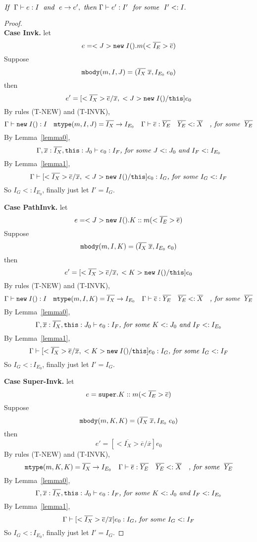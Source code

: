 \begin{theorem}
$\textit{If } \ \judgeewf \Gamma {e : I} \; \textit{ and } \ e \rightarrow e',\ 
\textit{then } \judgeewf \Gamma {e' : I'} \ \textit{ for some } \ I' <: I.$
\end{theorem}


\begin{proof} ~\\
\noindent \textbf{Case Invk.} 
let \[ e = <J>\texttt{new} \; I().m(<\overline{I_E}>\overline{e}) \] 
Suppose \[ \texttt{mbody}(m, I, J) = (\overline{I_X} \; \overline{x}, I_{E_0} \; e_0) \] 
then \[ e' =  [<\overline{I_X}>\overline{e}/\overline{x}, \; <J>\texttt{new} \; I()/\texttt{this} ] e_0 \] 
By rules (T-NEW) and (T-INVK), 
  \[ \Gamma \; {\vdash} \; \texttt{new} \; I():I \quad 
     \texttt{mtype}(m, I, J) = \overline{I_X} \rightarrow I_{E_0} \quad 
     \Gamma \; {\vdash} \; \overline{e} : \overline{Y_E} \quad
     \overline{Y_E} <: \overline{X} \quad
     \textit{, for some } \; \overline{Y_E}
  \]
By Lemma~\ref{lemma0},
    \[
    \Gamma, \overline{x}:\overline{I_X}, \texttt{this}:J_0 \; {\vdash} \; e_0:I_F \textit{, for some } J <: J_0 \textit{ and } I_F <: I_{E_0}
    \]
By Lemma~\ref{lemma1},
    \[
    \Gamma \; {\vdash} \; [<\overline{I_X}>\overline{e}/\overline{x}, \; <J>\texttt{new} \; I()/\texttt{this} ] e_0  :  I_G \textit{, for some } I_G <: I_F 
    \]
So $I_G <: I_{E_0}$, finally just let $I' = I_G$.

\noindent \textbf{Case PathInvk.}
let \[ e = <J>\texttt{new} \; I().K::m(<\overline{I_E}>\overline{e}) \]  
Suppose \[ \texttt{mbody}(m, I, K) = (\overline{I_X} \; \overline{x}, I_{E_0} \; e_0) \] 
then \[ e' =  [<\overline{I_X}>\overline{e}/\overline{x}, \; <K>\texttt{new} \; I()/\texttt{this} ] e_0 \] 
By rules (T-NEW) and (T-INVK), 
  \[ \Gamma \; {\vdash} \; \texttt{new} \; I():I \quad 
     \texttt{mtype}(m, I, K) = \overline{I_X} \rightarrow I_{E_0} \quad 
     \Gamma \; {\vdash} \; \overline{e} : \overline{Y_E} \quad
     \overline{Y_E} <: \overline{X} \quad
     \textit{, for some } \; \overline{Y_E}
  \]
By Lemma~\ref{lemma0},
    \[
    \Gamma, \overline{x}:\overline{I_X}, \texttt{this}:J_0 \; {\vdash} \; e_0:I_F \textit{, for some } K <: J_0 \textit{ and } I_F <: I_{E_0}
    \]
By Lemma~\ref{lemma1},
    \[
    \Gamma \; {\vdash} \; [<\overline{I_X}>\overline{e}/\overline{x}, \; <K>\texttt{new} \; I()/\texttt{this} ] e_0  :  I_G \textit{, for some } I_G <: I_F 
    \]
So $I_G <: I_{E_0}$, finally just let $I' = I_G$.

\noindent \textbf{Case Super-Invk.}
let \[ e = \texttt{super}.K::m(<\overline{I_E}>\overline{e}) \]   
Suppose \[ \texttt{mbody}(m, K, K) = (\overline{I_X} \; \overline{x}, I_{E_0} \; e_0) \] 
then \[ e' =  [<\overline{I_X}>\overline{e}/\overline{x}] e_0 \] 
By rules (T-NEW) and (T-INVK), 
  \[ 
     \texttt{mtype}(m, K, K) = \overline{I_X} \rightarrow I_{E_0} \quad 
     \Gamma \; {\vdash} \; \overline{e} : \overline{Y_E} \quad
     \overline{Y_E} <: \overline{X} \quad
     \textit{, for some } \; \overline{Y_E}
  \]
By Lemma~\ref{lemma0},
    \[
    \Gamma, \overline{x}:\overline{I_X}, \texttt{this}:J_0 \; {\vdash} \; e_0:I_F \textit{, for some } K <: J_0 \textit{ and } I_F <: I_{E_0}
    \]
By Lemma~\ref{lemma1},
    \[
    \Gamma \; {\vdash} \; [<\overline{I_X}>\overline{e}/\overline{x} ] e_0  :  I_G \textit{, for some } I_G <: I_F 
    \]
So $I_G <: I_{E_0}$, finally just let $I' = I_G$.


\end{proof}
